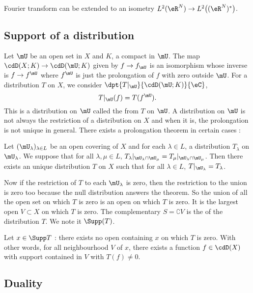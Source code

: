 \begin{corollary}
Fourier transform can be extended to an isometry $L^2(\eR^N)\to L^2\big( (\eR^N)^* \big)$.
\end{corollary}

\subsection{Support of a distribution}

Let $\mU$ be an open set in $X$ and $K$, a compact in $\mU$. The map $\cdD(X;K)\to\cdD(\mU;K)$ given by $f\to f_{\mU}$ is an isomorphism whose inverse is $f\to f^{\mU}$ where $f^{\mU}$ is just the prolongation of $f$ with zero outside $\mU$. For a distribution $T$ on $X$, we consider $\dpt{T|_{\mU}}{\cdD(\mU;K)}{\eC}$,
\[ 
         T|_{\mU}(f)=T(f^{\mU}).
\]
This is a distribution on $\mU$ called the  from $T$ on $\mU$. A distribution on $\mU$ is not always the restriction of a distribution on $X$ and when it is, the prolongation is not unique in general. There exists a prolongation theorem in certain cases :

\begin{theorem}
Let $(\mU_{\lambda})_{\lambda\in L}$ be an open covering of $X$ and for each $\lambda\in L$, a distribution $T_{\lambda}$ on $\mU_{\lambda}$. We suppose that for all $\lambda,\mu\in L$, $T_{\lambda}|_{\mU_{\lambda}\cap\mU_{\mu}}=T_{\mu}|_{\mU_{\lambda}\cap\mU_{\mu}}$. Then there exists an unique distribution $T$ on $X$ such that for all $\lambda\in L$, $T|_{\mU_{\lambda}}=T_{\lambda}$.
\end{theorem}

Now if the restriction  of $T$ to each $\mU_{\lambda}$ is zero, then the restriction to the union is zero too because the null distribution answers the theorem. So the union of all the open set on which $T$ is zero is an open on which $T$ is zero. It is the largest open $V\subset X$ on which $T$ is zero. The complementary $S=\complement V$ is the  of the distribution $T$. We note it $\Supp(T)$.

Let $x\in\Supp T$ : there exists no open containing $x$ on which $T$ is zero. With other words, for all  neighbourhood $V$ of $x$, there exists a function $f\in\cdD(X)$ with support contained in $V$ with $T(f)\neq 0$. 

\subsection{Duality}

